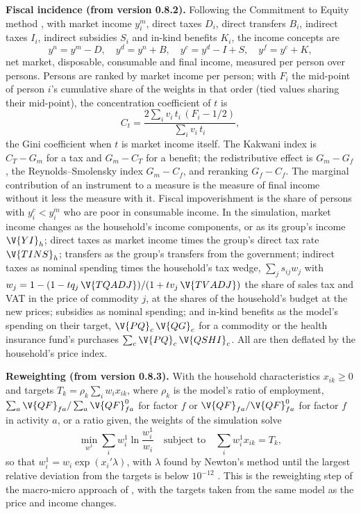 \textbf{Fiscal incidence (from version 0.8.2).} Following the Commitment to
Equity method \citep{lustig2018}, with market income $y^m_i$, direct taxes
$D_i$, direct transfers $B_i$, indirect taxes $I_i$, indirect subsidies $S_i$
and in-kind benefits $K_i$, the income concepts are
\begin{equation*}
y^n = y^m - D, \quad y^d = y^n + B, \quad y^c = y^d - I + S, \quad y^f = y^c + K,
\end{equation*}
net market, disposable, consumable and final income, measured per person
over persons. Persons are ranked by market income per person; with $F_i$ the
mid-point of person $i$'s cumulative share of the weights in that order
(tied values sharing their mid-point), the concentration coefficient of $t$ is
\begin{equation*}
C_t = \frac{2 \sum_i v_i\, t_i\, (F_i - 1/2)}{\sum_i v_i\, t_i},
\end{equation*}
the Gini coefficient when $t$ is market income itself. The Kakwani index
\citep{kakwani1977} is $C_T - G_m$ for a tax and $G_m - C_T$ for a benefit;
the redistributive effect is $G_m - G_f$, the Reynolds--Smolensky index
\citep{reynolds1977} $G_m - C_f$, and reranking $G_f - C_f$. The marginal
contribution of an instrument to a measure is the measure of final income
without it less the measure with it. Fiscal impoverishment
\citep{higgins2016} is the share of persons with $y^c_i < y^m_i$ who are poor
in consumable income. In the simulation, market income changes as the
household's income components, or as its group's income $\V{YI}_h$; direct
taxes as market income times the group's direct tax rate $\V{TINS}_h$;
transfers as the group's transfers from the government; indirect taxes as
nominal spending times the household's tax wedge, $\sum_j s_{ij} w_j$ with
$w_j = 1 - (1 - tq_j\,\V{TQADJ})/(1 + tv_j\,\V{TVADJ})$ the share of sales
tax and VAT in the price of commodity $j$, at the shares of the household's
budget at the new prices; subsidies as nominal spending; and in-kind benefits
as the model's spending on their target, $\V{PQ}_c\,\V{QG}_c$ for a commodity
or the health insurance fund's purchases $\sum_c \V{PQ}_c\,\V{QSHI}_c$. All
are then deflated by the household's price index.

\textbf{Reweighting (from version 0.8.3).} With the household
characteristics $x_{ik} \ge 0$ and targets $T_k = \rho_k \sum_i w_i x_{ik}$,
where $\rho_k$ is the model's ratio of employment, $\sum_a \V{QF}_{fa} /
\sum_a \V{QF}^0_{fa}$ for factor $f$ or $\V{QF}_{fa}/\V{QF}^0_{fa}$ for factor
$f$ in activity $a$, or a ratio given, the weights of the simulation solve
\begin{equation*}
\min_{w^1} \sum_i w^1_i \ln\frac{w^1_i}{w_i} \quad \text{subject to} \quad \sum_i w^1_i x_{ik} = T_k,
\end{equation*}
so that $w^1_i = w_i \exp(x_i'\lambda)$, with $\lambda$ found by Newton's
method until the largest relative deviation from the targets is below
$10^{-12}$ \citep{wittenberg2010}. This is the reweighting step of the
macro-micro approach of \citet{corral2022}, with the targets taken from the
same model as the price and income changes.


